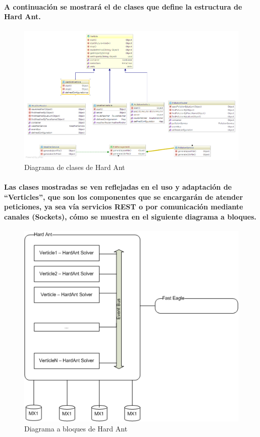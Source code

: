     \paragraph{A continuación se mostrará el de clases que define la estructura de Hard Ant.}
      \begin{figure}[b!]
        \centering
        \includegraphics[width=\textwidth]{./images/HardAntClassDiagram.png}
        \caption{Diagrama de clases de Hard Ant}
      \end{figure}
    \paragraph{Las clases mostradas se ven reflejadas en el uso y adaptación de ``Verticles'', que son los componentes que se encargarán de atender peticiones, ya sea vía servicios REST o por comunicación mediante canales (Sockets), cómo se muestra en el siguiente diagrama a bloques.}
      \begin{figure}[b!]
        \centering
        \includegraphics[width=\textwidth]{./images/DiagramaHardAnt.png}
        \caption{Diagrama a bloques de Hard Ant}
      \end{figure}
